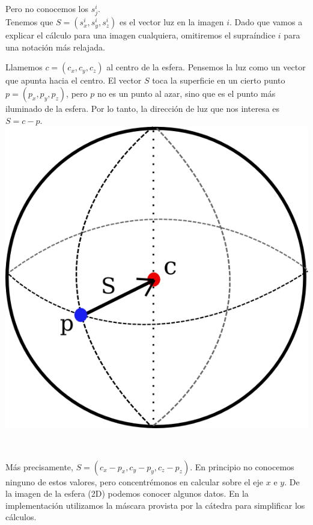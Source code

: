 Pero no conocemos los $s_{j}^{i}$. \\

Tenemos que $S = (s_{x}^{i}, s_{y}^{i}, s_{z}^{i})$ es el vector luz en la imagen $i$. Dado que vamos a explicar el cálculo para una imagen cualquiera, omitiremos el supraíndice $i$ para una notación más relajada.

Llamemos $c = (c_{x}, c_{y}, c_{z})$ al centro de la esfera. Pensemos la luz como un vector que apunta hacia el centro. El vector $S$ toca la superficie en un cierto punto $p = (p_{x}, p_{y}, p_{z})$, pero $p$ no es un punto al azar, sino que es el punto más iluminado de la esfera. Por lo tanto, la dirección de luz que nos interesa es $S =  c - p$.\\

{\centering
    \includegraphics[scale=0.9]{informe/imagenes/esfera/esferaModelo.png} \\
}

$ $\newline

Más precisamente, $S = (c_{x} - p_{x}, c_{y} - p_{y}, c_{z} - p_{z}).$ En principio no conocemos ninguno de estos valores, pero concentrémonos en calcular sobre el eje $x$ e $y$. De la imagen de la esfera (2D) podemos conocer algunos datos. En la implementación utilizamos la máscara provista por la cátedra para simplificar los cálculos. \\

